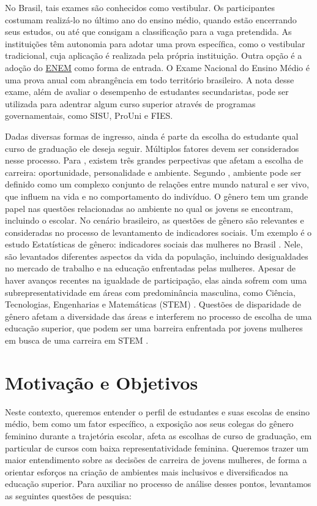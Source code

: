 No Brasil, tais exames são conhecidos como vestibular. Os participantes costumam realizá-lo no último ano do ensino médio, quando estão encerrando seus estudos, ou até que consigam a classificação para a vaga pretendida. As instituições têm autonomia para adotar uma prova específica, como o vestibular tradicional, cuja aplicação é realizada pela própria instituição. Outra opção é a adoção do \href{https://www.gov.br/inep/pt-br/areas-de-atuacao/avaliacao-e-exames-educacionais/enem}{ENEM} como forma de entrada. O Exame Nacional do Ensino Médio é uma prova anual com abrangência em todo território brasileiro. A nota desse exame, além de avaliar o desempenho de estudantes secundaristas, pode ser utilizada para adentrar algum curso superior através de programas governamentais, como SISU, ProUni e FIES.

Dadas diversas formas de ingresso, ainda é parte da escolha do estudante qual curso de graduação ele deseja seguir. Múltiplos fatores devem ser considerados nesse processo. Para \citet{Borchert2001}, existem três grandes perpectivas que afetam a escolha de carreira: oportunidade, personalidade e ambiente. Segundo \citet{Abbagnano2012}, ambiente pode ser definido como um complexo conjunto de relações entre mundo natural e ser vivo, que influem na vida e no comportamento do indivíduo. O gênero tem um grande papel nas questões relacionadas ao ambiente no qual os jovens se encontram, incluindo o escolar. No cenário brasileiro, as questões de gênero são relevantes e consideradas no processo de levantamento de indicadores sociais. Um exemplo é o estudo Estatísticas de gênero: indicadores sociais das mulheres no Brasil \autocite{ibge}. Nele, são levantados diferentes aspectos da vida da população, incluindo desigualdades no mercado de trabalho e na educação enfrentadas pelas mulheres. Apesar de haver avanços recentes na igualdade de participação, elas ainda sofrem com uma subrepresentatividade em áreas com predominância masculina, como Ciência, Tecnologias, Engenharias e Matemáticas (STEM) \autocite{Saavedra2010}. Questões de disparidade de gênero afetam a diversidade das áreas e interferem no processo de escolha de uma educação superior, que podem ser uma barreira enfrentada por jovens mulheres em busca de uma carreira em STEM \autocite{VerdugoCastro2022}. 

\section{Motivação e Objetivos}
Neste contexto, queremos entender o perfil de estudantes e suas escolas de ensino médio, bem como um fator específico, a exposição aos seus colegas do gênero feminino durante a trajetória escolar, afeta as escolhas de curso de graduação, em particular de cursos com baixa representatividade feminina. Queremos trazer um maior entendimento sobre as decisões de carreira de jovens mulheres, de forma a orientar esforços na criação de ambientes mais inclusivos e diversificados na educação superior. Para auxiliar no processo de análise desses pontos, levantamos as seguintes questões de pesquisa:

